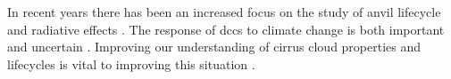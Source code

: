 











In recent years there has been an increased focus on the study of anvil lifecycle \citep{wall_life_2018, sokol_tropical_2020} and radiative effects \citep{bouniol_life_2021}.
The response of \acrshort{dcc}s to climate change is both important and uncertain \citep{sherwood_assessment_2020, hill_climate_2023}.
Improving our understanding of cirrus cloud properties and lifecycles is vital to improving this situation \citep{sullivan_ice_2021, gasparini_opinion_2023}.

